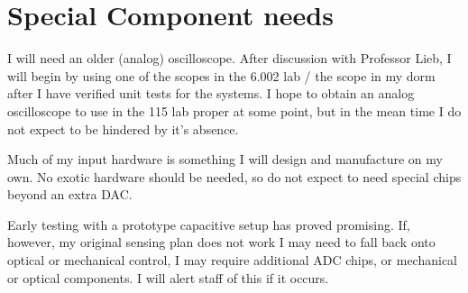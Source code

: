 \section{Special Component needs}

I will need an older (analog) oscilloscope. After discussion with Professor Lieb, I will begin by using one of the scopes in the 6.002 lab / the scope in my dorm after I have verified unit tests for the systems. I hope to obtain an analog oscilloscope to use in the 115 lab proper at some point, but in the mean time I do not expect to be hindered by it's absence.

Much of my input hardware is something I will design and manufacture on my own. No exotic hardware should be needed, so do not expect to need special chips beyond an extra DAC.

Early testing with a prototype capacitive setup has proved promising. If, however, my original sensing plan does not work I may need to fall back onto optical or mechanical control, I may require additional ADC chips, or mechanical or optical components. I will alert staff of this if it occurs.
